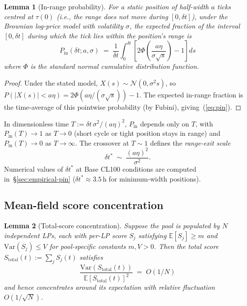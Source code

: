 \documentclass[11pt,a4paper]{article}
\theoremstyle{cgdefinition}
\theoremstyle{cgplain}
\newtheorem{lemma}{Lemma}
\theoremstyle{cgremark}
\begin{document}
\begin{lemma}[In-range probability]\label{lem:pin}
For a \emph{static} position of half-width $a$ ticks centred at $\tau(0)$ (i.e., the range does not move during $[0, \delta t]$), under the Brownian log-price model with volatility $\sigma$, the expected fraction of the interval $[0, \delta t]$ during which the tick lies within the position's range is
\begin{equation}\label{eq:pin}
P_{\text{in}}(\delta t; a, \sigma) \;=\; \frac{1}{\delta t} \int_0^{\delta t} \left[2\Phi\!\left(\frac{a\eta}{\sigma \sqrt{s}}\right) - 1\right] ds
\end{equation}
where $\Phi$ is the standard normal cumulative distribution function.
\end{lemma}

\begin{proof}
Under the stated model, $X(s) \sim \mathcal{N}(0, \sigma^2 s)$, so $P(|X(s)| < a\eta) = 2\Phi(a\eta/(\sigma\sqrt{s})) - 1$. The expected in-range fraction is the time-average of this pointwise probability (by Fubini), giving~(\ref{eq:pin}).
\end{proof}

In dimensionless time $T := \delta t\,\sigma^2/(a\eta)^2$, $P_{\text{in}}$ depends only on $T$, with $P_{\text{in}}(T) \to 1$ as $T \to 0$ (short cycle or tight position stays in range) and $P_{\text{in}}(T) \to 0$ as $T \to \infty$. The crossover at $T \sim 1$ defines the \emph{range-exit scale}
\begin{equation}\label{eq:exitscale}
\delta t^* \;\sim\; \frac{(a\eta)^2}{\sigma^2}.
\end{equation}
Numerical values of $\delta t^*$ at Base CL100 conditions are computed in~\S\ref{sec:empirical-pin} ($\delta t^* \approx 3.5$\,h for minimum-width positions).

\subsection{Mean-field score concentration}\label{sec:meanfield}

\begin{lemma}[Total-score concentration]\label{lem:meanfield}
Suppose the pool is populated by $N$ independent LPs, each with per-LP score $S_j$ satisfying $\mathbb{E}[S_j] \geq m$ and $\mathrm{Var}(S_j) \leq V$ for pool-specific constants $m, V > 0$. Then the total score $S_{\text{total}}(t) := \sum_j S_j(t)$ satisfies
\begin{equation}
\frac{\mathrm{Var}(S_{\text{total}}(t))}{\mathbb{E}[S_{\text{total}}(t)]^2} \;=\; O(1/N)
\end{equation}
and hence concentrates around its expectation with relative fluctuation $O(1/\sqrt{N})$.
\end{lemma}
\end{document}
